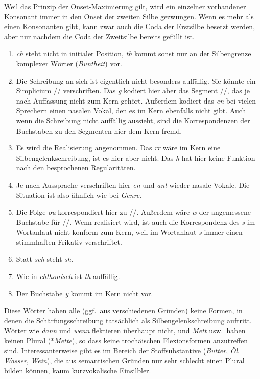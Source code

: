  Weil das Prinzip der Onset-Maximierung gilt, wird ein einzelner vorhandener Konsonant immer in den Onset der zweiten Silbe gezwungen.
Wenn es mehr als einen Konsonanten gibt, kann zwar auch die Coda der Erstsilbe besetzt werden, aber nur nachdem die Coda der Zweitsilbe bereits gefüllt ist.


\begin{enumerate}\Lf
  \item \textit{ch} steht nicht in initialer Position, \textit{th} kommt sonst nur an der Silbengrenze komplexer Wörter (\textit{Buntheit}) vor.
  \item Die Schreibung an sich ist eigentlich nicht besonders auffällig.
    Sie könnte ein Simplicium // verschriften.
    Das \textit{g} kodiert hier aber das Segment //, das je nach Auffassung nicht zum Kern gehört.
    Außerdem kodiert das \textit{en} bei vielen Sprechern einen nasalen Vokal, den es im Kern ebenfalls nicht gibt.
    Auch wenn die Schreibung nicht auffällig aussieht, sind die Korrespondenzen der Buchstaben zu den Segmenten hier dem Kern fremd.
  \item Es wird die Realisierung \textipa{[gonoK\o:]} angenommen.
    Das \textit{rr} wäre im Kern eine Silbengelenkschreibung, ist es hier aber nicht.
    Das \textit{h} hat hier keine Funktion nach den besprochenen Regularitäten.
  \item Je nach Aussprache verschriften hier \textit{en} und \textit{ant} wieder nasale Vokale.
    Die Situation ist also ähnlich wie bei \textit{Genre}.
  \item Die Folge \textit{ou} korrespondiert hier zu //.
    Außerdem wäre \textit{w} der angemessene Buchstabe für //.
    Wenn \textipa{[su:v@n\t{i5}]} realisiert wird, ist auch die Korrespondenz des \textit{s} im Wortanlaut nicht konform zum Kern, weil im Wortanlaut \textit{s} immer einen stimmhaften Frikativ verschriftet.
  \item Statt \textit{sch} steht \textit{sh}.
  \item Wie in \textit{chthonisch} ist \textit{th} auffällig.
  \item Der Buchstabe \textit{y} kommt im Kern nicht vor.
\end{enumerate}


 Diese Wörter haben alle (ggf.\ aus verschiedenen Gründen) keine Formen, in denen die Schärfungsschreibung tatsächlich als Silbengelenkschreibung auftritt.
Wörter wie \textit{dann} und \textit{wenn} flektieren überhaupt nicht, und \textit{Mett} usw.\ haben keinen Plural (*\textit{Mette}), so dass keine trochäischen Flexionsformen anzutreffen sind.
Interessanterweise gibt es im Bereich der Stoffsubstantive (\textit{Butter}, \textit{Öl}, \textit{Wasser}, \textit{Wein}), die aus semantischen Gründen nur sehr schlecht einen Plural bilden können, kaum kurzvokalische Einsilbler.

